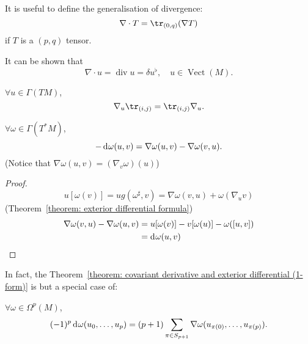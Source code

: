 \documentclass[openany, oneside, a5paper]{book}
\DeclareMathOperator{\Vect}{Vect}
\begin{document}
It is useful to define the generalisation of divergence:
\begin{equation}
    \nabla \cdot T = \tr_{(0, q)} (\nabla T)
\end{equation}
if $T$ is a $(p, q)$ tensor.

It can be shown that
\begin{equation}
    \nabla \cdot u = \operatorname{div} u = \delta u^\flat,
    \quad
    u \in \Vect(M).
\end{equation}

\begin{theorem}
    $\forall u \in \Gamma(TM)$,
    \begin{equation}
        \nabla_u \tr_{(i, j)} = \tr_{(i, j)} \nabla_u.
    \end{equation}
\end{theorem}

\begin{theorem}\label{theorem: covariant derivative and exterior differential (1-form)}
    $\forall \omega \in \Gamma(T^*M)$,
    \begin{equation}
        - \mathop{}\!\mathrm{d}^{} \omega(u, v) = \nabla \omega(u, v) - \nabla\omega(v, u).
    \end{equation}
    (Notice that $\nabla \omega(u, v) = (\nabla_v \omega) (u)$)
\end{theorem}
\begin{proof}
    \begin{equation}
        u[\omega(v)] = u g(\omega^\sharp, v) = \nabla \omega(v, u) + \omega(\nabla_u v)
    \end{equation}
    \hence (Theorem~\ref{theorem: exterior differential formula})
    \begin{align}
        \nabla \omega(v, u) - \nabla \omega (u, v) 
        &= u[\omega(v)] - v[\omega(u)] - \omega([u, v])
        \\
        &= \mathop{}\!\mathrm{d}^{} \omega(u, v)
    \end{align}
\end{proof}

In fact, the Theorem~\ref{theorem: covariant derivative and exterior differential (1-form)} is but a special case of:
\begin{theorem}\label{theorem: covariant derivative and exterior differential}
    $\forall \omega \in \Omega^p(M)$,
    \begin{equation}
        (-1)^p \mathop{}\!\mathrm{d}^{} \omega(u_0, \ldots, u_p) = 
        (p + 1) \sum_{\pi \in S_{p + 1}} \nabla \omega (u_{\pi(0)}, \ldots, u_{\pi(p)}).
    \end{equation}
    
\end{theorem}



\backmatter{}
\nocite{*} %
\printbibliography[heading=bibliography, title={bibliography}]

\printindex[symbol]

\printindex
\end{document}
